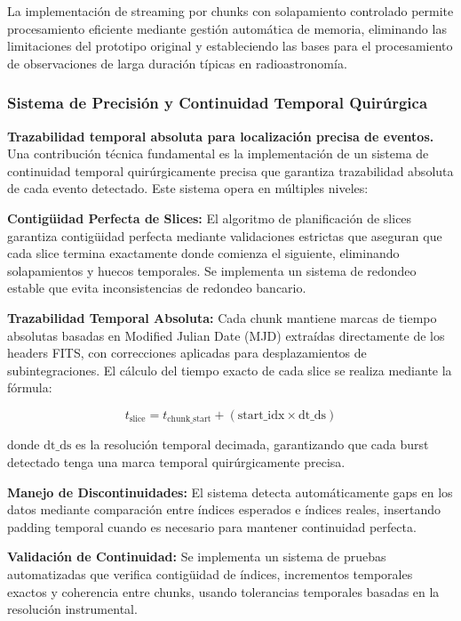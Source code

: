 La implementación de streaming por chunks con solapamiento controlado permite procesamiento eficiente mediante gestión automática de memoria, eliminando las limitaciones del prototipo original y estableciendo las bases para el procesamiento de observaciones de larga duración típicas en radioastronomía.

\subsubsection{Sistema de Precisión y Continuidad Temporal Quirúrgica}

\noindent\textbf{Trazabilidad temporal absoluta para localización precisa de eventos.} Una contribución técnica fundamental es la implementación de un sistema de continuidad temporal quirúrgicamente precisa que garantiza trazabilidad absoluta de cada evento detectado. Este sistema opera en múltiples niveles:

\textbf{Contigüidad Perfecta de Slices:} El algoritmo de planificación de slices garantiza contigüidad perfecta mediante validaciones estrictas que aseguran que cada slice termina exactamente donde comienza el siguiente, eliminando solapamientos y huecos temporales. Se implementa un sistema de redondeo estable que evita inconsistencias de redondeo bancario.

\textbf{Trazabilidad Temporal Absoluta:} Cada chunk mantiene marcas de tiempo absolutas basadas en Modified Julian Date (MJD) extraídas directamente de los headers FITS, con correcciones aplicadas para desplazamientos de subintegraciones. El cálculo del tiempo exacto de cada slice se realiza mediante la fórmula:

\[
t_{\text{slice}} = t_{\text{chunk\_start}} + (\text{start\_idx} \times \text{dt\_ds})
\]

donde $\text{dt\_ds}$ es la resolución temporal decimada, garantizando que cada burst detectado tenga una marca temporal quirúrgicamente precisa.

\textbf{Manejo de Discontinuidades:} El sistema detecta automáticamente gaps en los datos mediante comparación entre índices esperados e índices reales, insertando padding temporal cuando es necesario para mantener continuidad perfecta.

\textbf{Validación de Continuidad:} Se implementa un sistema de pruebas automatizadas que verifica contigüidad de índices, incrementos temporales exactos y coherencia entre chunks, usando tolerancias temporales basadas en la resolución instrumental.

